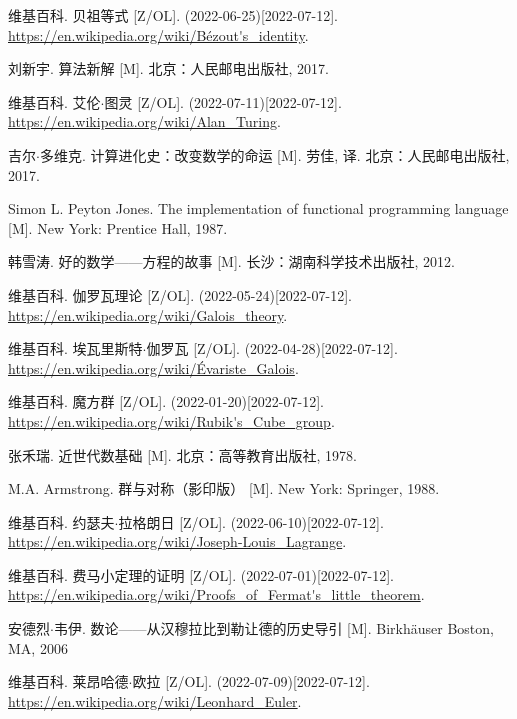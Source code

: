 \documentclass[UTF8]{article}
\begin{document}
\begin{thebibliography}{99}
维基百科. 贝祖等式 [Z/OL]. (2022-06-25)[2022-07-12]. \url{https://en.wikipedia.org/wiki/Bézout's_identity}.

刘新宇. 算法新解 [M]. 北京：人民邮电出版社, 2017. %

维基百科. 艾伦$\cdot$图灵 [Z/OL]. (2022-07-11)[2022-07-12]. \url{https://en.wikipedia.org/wiki/Alan_Turing}.

吉尔$\cdot$多维克. 计算进化史：改变数学的命运 [M]. 劳佳, 译. 北京：人民邮电出版社, 2017. %

Simon L. Peyton Jones. The implementation of functional programming language [M]. New York: Prentice Hall, 1987. %


韩雪涛. 好的数学——方程的故事 [M]. 长沙：湖南科学技术出版社, 2012. %

维基百科. 伽罗瓦理论 [Z/OL]. (2022-05-24)[2022-07-12]. \url{https://en.wikipedia.org/wiki/Galois_theory}.

维基百科. 埃瓦里斯特$\cdot$伽罗瓦 [Z/OL]. (2022-04-28)[2022-07-12]. \url{https://en.wikipedia.org/wiki/Évariste_Galois}.

维基百科. 魔方群 [Z/OL]. (2022-01-20)[2022-07-12]. \url{https://en.wikipedia.org/wiki/Rubik's_Cube_group}.

张禾瑞. 近世代数基础 [M]. 北京：高等教育出版社, 1978. %

M.A. Armstrong. 群与对称（影印版） [M]. New York: Springer, 1988. %

维基百科. 约瑟夫$\cdot$拉格朗日 [Z/OL]. (2022-06-10)[2022-07-12]. \url{https://en.wikipedia.org/wiki/Joseph-Louis_Lagrange}.

维基百科. 费马小定理的证明 [Z/OL]. (2022-07-01)[2022-07-12]. \url{https://en.wikipedia.org/wiki/Proofs_of_Fermat's_little_theorem}.

安德烈$\cdot$韦伊. 数论——从汉穆拉比到勒让德的历史导引 [M]. Birkhäuser Boston, MA, 2006 %

维基百科. 莱昂哈德$\cdot$欧拉 [Z/OL]. (2022-07-09)[2022-07-12]. \url{https://en.wikipedia.org/wiki/Leonhard_Euler}.


\end{thebibliography}
\end{document}
